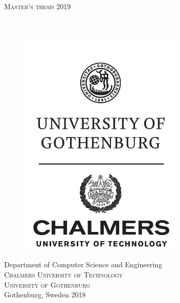 \newpage
\thispagestyle{empty}
\begin{center}
	\textsc{\large Master's thesis 2019}\\[4cm]
	\textbf{\Large \titleA} \\[1cm]
	{\large \titleB}\\[1cm]
	{\large \me}
	
	\vfill	
	\begin{figure}[H]
	\centering
	\includegraphics[width=0.25\pdfpagewidth]{figure/auxiliary/ChGULogoHog.pdf}
	\end{figure}	\vspace{5mm}	
	
	Department of Computer Science and Engineering\\
	\textsc{Chalmers University of Technology} \\
	\textsc{University of Gothenburg} \\
	Gothenburg, Sweden 2018 \\
\end{center}


\newpage
\thispagestyle{plain}
\vspace*{4.5cm}
\titleA\\
\titleB\\
\me \setlength{\parskip}{1cm}


